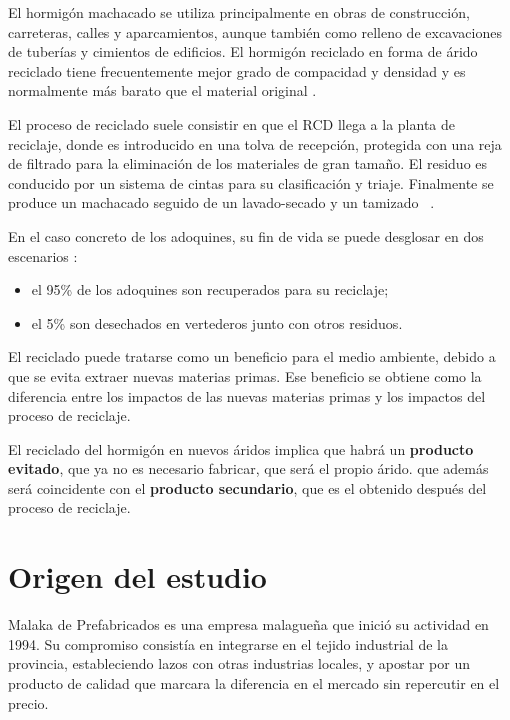 El hormigón machacado se utiliza principalmente en obras de construcción, carreteras, calles y aparcamientos, aunque también como relleno de excavaciones de tuberías y cimientos de edificios. El hormigón reciclado en forma de árido reciclado tiene frecuentemente mejor grado de compacidad y densidad y es normalmente más barato que el material original \cite{jsjunnesson}.

El proceso de reciclado suele consistir en que el RCD llega a la planta de reciclaje, donde es introducido en una tolva de recepción, protegida con una reja de filtrado para la eliminación de los materiales de gran tamaño. El residuo es conducido por un sistema de cintas para su clasificación y triaje. Finalmente se produce un machacado seguido de un lavado-secado y un tamizado \cite{monografia} \cite{gerd}.

En el caso concreto de los adoquines, su fin de vida se puede desglosar en dos escenarios \cite{euroadoquin}:
\begin{itemize}
  \item el 95\% de los adoquines son recuperados para su reciclaje;
  \item el 5\% son desechados en vertederos junto con otros residuos.
\end{itemize}

El reciclado puede tratarse como un beneficio para el medio ambiente, debido a que se evita extraer nuevas materias primas. Ese beneficio se obtiene como la diferencia entre los impactos de las nuevas materias primas y los impactos del proceso de reciclaje.

El reciclado del hormigón en nuevos áridos implica que habrá un \textbf{producto evitado}, que ya no es necesario fabricar, que será el propio árido. que además será coincidente con el \textbf{producto secundario}, que es el obtenido después del proceso de reciclaje.

\section{Origen del estudio}
Malaka de Prefabricados es una empresa malagueña que inició su actividad en 1994. Su compromiso consistía en integrarse en el tejido industrial de la provincia, estableciendo lazos con otras industrias locales, y apostar por un producto de calidad que marcara la diferencia en el mercado sin repercutir en el precio.

